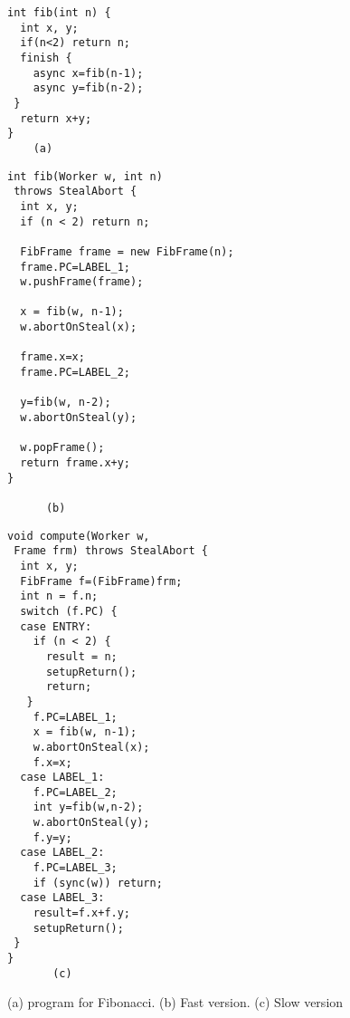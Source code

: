 \begin{figure*}
\begin{minipage}{0.25\textwidth}
\scriptsize
\begin{verbatim}
int fib(int n) {
  int x, y;
  if(n<2) return n;
  finish {
    async x=fib(n-1);
    async y=fib(n-2);
 }
  return x+y;
}
    (a)
\end{verbatim}
\end{minipage}%
\begin{minipage}{0.4\textwidth}
\scriptsize
\begin{verbatim}
int fib(Worker w, int n) 
 throws StealAbort { 
  int x, y;
  if (n < 2) return n;

  FibFrame frame = new FibFrame(n);
  frame.PC=LABEL_1;
  w.pushFrame(frame);

  x = fib(w, n-1);
  w.abortOnSteal(x);

  frame.x=x;
  frame.PC=LABEL_2;

  y=fib(w, n-2);
  w.abortOnSteal(y);

  w.popFrame();
  return frame.x+y;
}

      (b)
\end{verbatim}
\end{minipage}%
\begin{minipage}{0.45\textwidth}
\scriptsize
\begin{verbatim}
void compute(Worker w, 
 Frame frm) throws StealAbort {
  int x, y;
  FibFrame f=(FibFrame)frm;
  int n = f.n;
  switch (f.PC) {
  case ENTRY: 
    if (n < 2) {
      result = n;
      setupReturn();
      return;
   }
    f.PC=LABEL_1;
    x = fib(w, n-1);
    w.abortOnSteal(x);
    f.x=x;
  case LABEL_1: 
    f.PC=LABEL_2;
    int y=fib(w,n-2);
    w.abortOnSteal(y);
    f.y=y;
  case LABEL_2: 
    f.PC=LABEL_3;
    if (sync(w)) return;
  case LABEL_3:
    result=f.x+f.y;
    setupReturn();
 }
}
       (c)
\end{verbatim}
\end{minipage}%
\caption{(a) \Xten{} program for Fibonacci. (b) Fast version. (c) Slow version}%
\label{fig:fib-ill}
\end{figure*}
